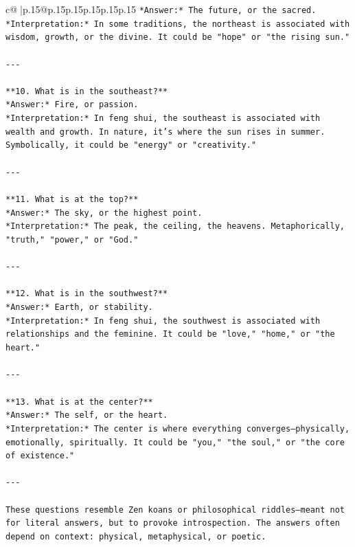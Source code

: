 \documentclass{article}
\begin{document}
{\begin{supertabular}{c@{$\;$}|p{.15\linewidth}@{}p{.15\linewidth}p{.15\linewidth}p{.15\linewidth}p{.15\linewidth}p{.15\linewidth}}
{{{\texttt{*Answer:* The future, or the sacred.  } \\
\texttt{*Interpretation:* In some traditions, the northeast is associated with wisdom, growth, or the divine. It could be "hope" or "the rising sun."} \\
\\ 
\texttt{{-}{-}{-}} \\
\\ 
\texttt{**10. What is in the southeast?**  } \\
\texttt{*Answer:* Fire, or passion.  } \\
\texttt{*Interpretation:* In feng shui, the southeast is associated with wealth and growth. In nature, it’s where the sun rises in summer. Symbolically, it could be "energy" or "creativity."} \\
\\ 
\texttt{{-}{-}{-}} \\
\\ 
\texttt{**11. What is at the top?**  } \\
\texttt{*Answer:* The sky, or the highest point.  } \\
\texttt{*Interpretation:* The peak, the ceiling, the heavens. Metaphorically, "truth," "power," or "God."} \\
\\ 
\texttt{{-}{-}{-}} \\
\\ 
\texttt{**12. What is in the southwest?**  } \\
\texttt{*Answer:* Earth, or stability.  } \\
\texttt{*Interpretation:* In feng shui, the southwest is associated with relationships and the feminine. It could be "love," "home," or "the heart."} \\
\\ 
\texttt{{-}{-}{-}} \\
\\ 
\texttt{**13. What is at the center?**  } \\
\texttt{*Answer:* The self, or the heart.  } \\
\texttt{*Interpretation:* The center is where everything converges—physically, emotionally, spiritually. It could be "you," "the soul," or "the core of existence."} \\
\\ 
\texttt{{-}{-}{-}} \\
\\ 
\texttt{These questions resemble Zen koans or philosophical riddles—meant not for literal answers, but to provoke introspection. The answers often depend on context: physical, metaphysical, or poetic.} \\
}}}
\end{supertabular}}
\end{document}
